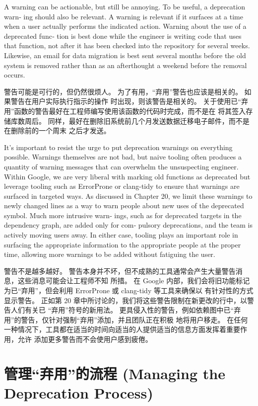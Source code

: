 \documentclass[10pt,a4paper,UTF8]{ctexart}
\begin{document}
A warning can be actionable, but still be annoying. To be useful, a deprecation warn‐ ing should
also be relevant. A warning is relevant if it surfaces at a time when a user actually performs the
indicated action. Warning about the use of a deprecated func‐ tion is best done while the engineer
is writing code that uses that function, not after it has been checked into the repository for
several weeks. Likewise, an email for data migration is best sent several months before the old
system is removed rather than as an afterthought a weekend before the removal occurs.

警告可能是可行的，但仍然很烦人。 为了有用，“弃用”警告也应该是相关的。 如果警告在用户实际执行指示的操作
时出现，则该警告是相关的。 关于使用已“弃用”函数的警告最好在工程师编写使用该函数的代码时完成，而不是在
将其签入存储库数周后。 同样，最好在删除旧系统前几个月发送数据迁移电子邮件，而不是在删除前的一个周末
之后才发送。

It’s important to resist the urge to put deprecation warnings on everything possible. Warnings
themselves are not bad, but naive tooling often produces a quantity of warning messages that can
overwhelm the unsuspecting engineer. Within Google, we are very liberal with marking old functions
as deprecated but leverage tooling such as ErrorProne or clang-tidy to ensure that warnings are
surfaced in targeted ways. As discussed in Chapter 20, we limit these warnings to newly changed
lines as a way to warn people about new uses of the deprecated symbol. Much more intrusive warn‐
ings, such as for deprecated targets in the dependency graph, are added only for com‐ pulsory
deprecations, and the team is actively moving users away. In either case, tooling plays an important
role in surfacing the appropriate information to the appropriate people at the proper time, allowing
more warnings to be added without fatiguing the user.

警告不是越多越好。 警告本身并不坏，但不成熟的工具通常会产生大量警告消息，这些消息可能会让工程师不知
所措。 在 Google 内部，我们会将旧功能标记为已“弃用”，但会利用 ErrorProne 或 clang-tidy 等工具来确保以
有针对性的方式显示警告。 正如第 20 章中所讨论的，我们将这些警告限制在新更改的行中，以警告人们有关已
“弃用”符号的新用法。 更具侵入性的警告，例如依赖图中已“弃用”的警告，仅针对强制“弃用”添加，并且团队正在积极
地将用户移走。 在任何一种情况下，工具都在适当的时间向适当的人提供适当的信息方面发挥着重要作用，允许
添加更多警告而不会使用户感到疲倦。

\section{管理“弃用”的流程 (Managing the Deprecation Process)}
\label{sec:orgd2a8bf0}
\end{document}
